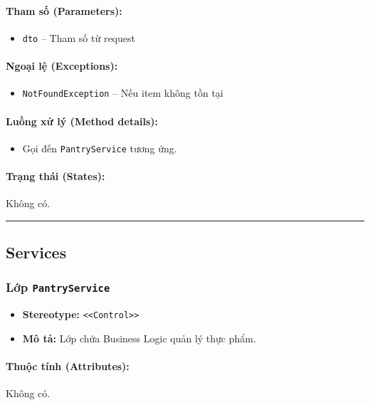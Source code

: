 \documentclass[12pt,a4paper]{article}
\begin{document}
\paragraph{Tham số (Parameters):}
\begin{itemize}[leftmargin=*]
    \item \texttt{dto} – Tham số từ request
\end{itemize}


\paragraph{Ngoại lệ (Exceptions):}
\begin{itemize}[leftmargin=*]
    \item \texttt{NotFoundException} – Nếu item không tồn tại
\end{itemize}


\paragraph{Luồng xử lý (Method details):}
\begin{itemize}[leftmargin=*]
    \item Gọi đến \texttt{PantryService} tương ứng.
\end{itemize}


\paragraph{Trạng thái (States):}
Không có.

\vskip 0.5cm
\noindent\rule{\textwidth}{0.5pt}
\vskip 0.5cm

\subsection{Services}


\subsubsection{Lớp \texttt{PantryService}}

\begin{itemize}[leftmargin=*]
    \item \textbf{Stereotype:} \texttt{\textless{}\textless{}Control\textgreater{}\textgreater{}}
    \item \textbf{Mô tả:} Lớp chứa Business Logic quản lý thực phẩm.
\end{itemize}

\paragraph{Thuộc tính (Attributes):}
Không có.
\end{document}
